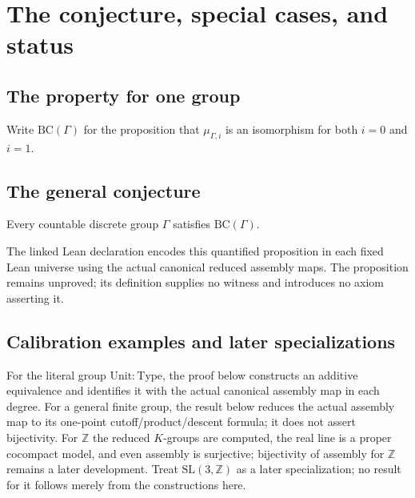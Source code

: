 \chapter{The conjecture, special cases, and status}
\label{ch:conjecture-and-examples}

\section{The property for one group}
\begin{definition}\label{def:baum-connes-property}
\leanok
Write $\mathrm{BC}(\Gamma)$ for the proposition that $\mu_{\Gamma,i}$
is an isomorphism for both $i=0$ and $i=1$.
\end{definition}

\section{The general conjecture}
\begin{conjecture}\label{conj:baum-connes}
\notready
Every countable discrete group $\Gamma$ satisfies $\mathrm{BC}(\Gamma)$.
\end{conjecture}

The linked Lean declaration encodes this quantified proposition in each
fixed Lean universe using the actual canonical reduced assembly maps.
The proposition remains unproved; its definition supplies no witness and
introduces no axiom asserting it.

\section{Calibration examples and later specializations}
For the literal group $\mathrm{Unit}:\mathrm{Type}$, the proof below
constructs an additive equivalence and identifies it with the actual canonical
assembly map in each degree. For a general finite group, the result below
reduces the actual assembly map to its one-point cutoff/product/descent
formula; it does not assert bijectivity. For $\mathbb Z$ the reduced
$K$-groups are computed, the real line is a proper cocompact model, and even
assembly is surjective; bijectivity of assembly for $\mathbb Z$ remains a
later development. Treat $\mathrm{SL}(3,\mathbb Z)$ as a later specialization;
no result for it follows merely from the constructions here.


